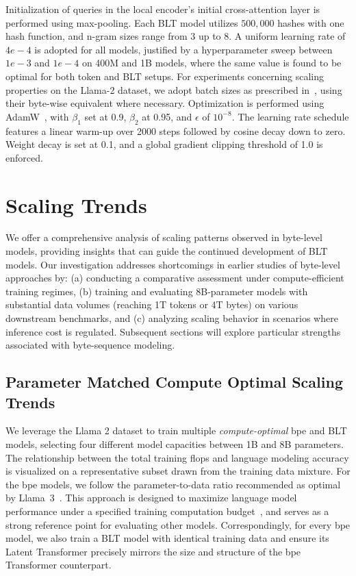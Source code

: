 Initialization of queries in the local encoder's initial cross-attention layer is performed using max-pooling. Each {\textsc BLT} model utilizes $500,000$ hashes with one hash function, and n-gram sizes range from 3 up to 8. A uniform learning rate of $4e-4$ is adopted for all models, justified by a hyperparameter sweep between $1e-3$ and $1e-4$ on 400M and 1B models, where the same value is found to be optimal for both token and {\textsc BLT} setups. For experiments concerning scaling properties on the Llama-2 dataset, we adopt batch sizes as prescribed in~\cite{dubey2024llama}, using their byte-wise equivalent where necessary. Optimization is performed using AdamW~\citep{adamw}, with $\beta_1$ set at 0.9, $\beta_2$ at 0.95, and $\epsilon$ of $10^{-8}$. The learning rate schedule features a linear warm-up over 2000 steps followed by cosine decay down to zero. Weight decay is set at 0.1, and a global gradient clipping threshold of 1.0 is enforced.

\section{Scaling Trends}
\label{section:scaling}

We offer a comprehensive analysis of scaling patterns observed in byte-level models, providing insights that can guide the continued development of {\textsc BLT} models. Our investigation addresses shortcomings in earlier studies of byte-level approaches by: (a) conducting a comparative assessment under compute-efficient training regimes, (b) training and evaluating 8B-parameter models with substantial data volumes (reaching 1T tokens or 4T bytes) on various downstream benchmarks, and (c) analyzing scaling behavior in scenarios where inference cost is regulated. Subsequent sections will explore particular strengths associated with byte-sequence modeling.

\subsection{Parameter Matched Compute Optimal Scaling Trends}
\label{section:parameter-matched-scaling}
We leverage the Llama 2 dataset to train multiple \textit{compute-optimal} bpe and {\textsc BLT} models, selecting four different model capacities between 1B and 8B parameters. The relationship between the total training flops and language modeling accuracy is visualized on a representative subset drawn from the training data mixture. For the bpe models, we follow the parameter-to-data ratio recommended as optimal by Llama~3~\citep{dubey2024llama}. This approach is designed to maximize language model performance under a specified training computation budget~\citep{hoffmann2022training}, and serves as a strong reference point for evaluating other models. Correspondingly, for every bpe model, we also train a {\textsc BLT} model with identical training data and ensure its Latent Transformer precisely mirrors the size and structure of the bpe Transformer counterpart.

